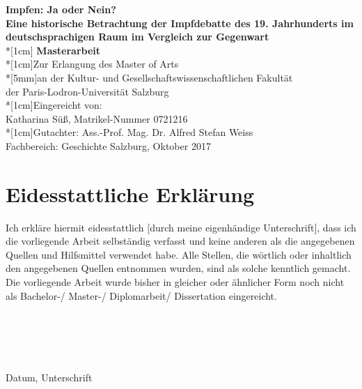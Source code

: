 \documentclass[
    a4paper,
    12pt,
    hyphens,
    chapterprefix=true,
    headheight=33pt,
    footheight=29pt,
    headings=optiontohead,
]{scrartcl}
\begin{document}
\thispagestyle{empty}
\begin{center}

\textbf{
{\Large
    Impfen: Ja oder Nein? \\
    Eine historische Betrachtung der Impfdebatte des 19. Jahrhunderts im deutschsprachigen Raum im Vergleich zur Gegenwart
    }
}
\\*[1cm]\Large { \textbf{Masterarbeit}
\\*[1cm]Zur Erlangung des Master of Arts
\\*[5mm]an der Kultur- und Gesellschaftswissenschaftlichen Fakultät
\\der Paris-Lodron-Universität Salzburg
\\*[1cm]Eingereicht von:
\\Katharina Süß, Matrikel-Nummer 0721216
\\*[1cm]Gutachter: Ass.-Prof. Mag. Dr. Alfred Stefan Weiss
\\Fachbereich: Geschichte
\vfill
Salzburg, Oktober 2017
}

\end{center}


\newpage
\tableofcontents
\newpage



\section{Eidesstattliche Erklärung}
Ich erkläre hiermit eidesstattlich [durch meine eigenhändige Unterschrift], dass ich die vorliegende Arbeit selbständig verfasst und keine anderen als die angegebenen Quellen und Hilfsmittel 
verwendet habe. Alle Stellen, die wörtlich oder inhaltlich den angegebenen Quellen entnommen wurden, sind als solche kenntlich gemacht. Die vorliegende Arbeit wurde bisher in gleicher oder ähnlicher Form noch nicht als Bachelor-/ Master-/ Diplomarbeit/ Dissertation eingereicht. \\
\\
\\
\\
\\
\\

Datum, Unterschrift

\newpage
\end{document}
